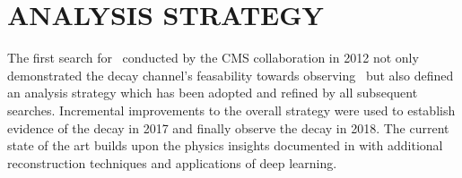 \chapter{ANALYSIS STRATEGY} \label{strategy}

The first search for \VHbb\ conducted by the CMS collaboration in 2012\cite{HIG13012} not only demonstrated the decay channel's feasability towards observing \Hbb\ but also defined an analysis strategy which has been adopted and refined by all subsequent searches. Incremental improvements to the overall strategy were used to establish evidence of the decay in 2017\cite{CMSVHbbEvidence} and finally observe the decay in 2018\cite{HIG18016}. The current state of the art builds upon the physics insights documented in \cite{CMSVHbbEvidence} with additional reconstruction techniques and applications of deep learning.

%
%
%
%
